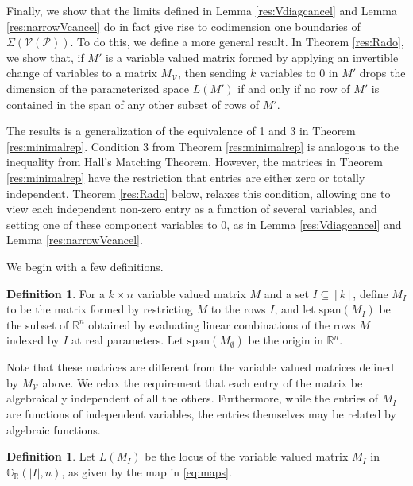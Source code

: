 \documentclass[11pt]{article}
\newcommand{\R}{\mathbb{R}}
\newcommand{\Grall}{\mathbb{G}_{\R}}
\newcommand{\cP}{\mathcal{P}}
\newcommand{\cV}{\mathcal{V}}
\newcommand{\VP}{\cV(\cP)}
\theoremstyle{remark}
\theoremstyle{definition}
\newtheorem{dfn}[thm]{Definition}
\begin{document}
\begin{appendices}

Finally, we show that the limits defined in Lemma \ref{res:Vdiagcancel} and Lemma \ref{res:narrowVcancel} do in fact give rise to codimension one boundaries of $\Sigma(\VP)$. To do this, we define a more general result. In Theorem \ref{res:Rado}, we show that, if $M'$ is a variable valued matrix formed by applying an invertible change of variables to a matrix $M_\cV$, then sending $k$ variables to $0$ in $M'$ drops the dimension of the parameterized space $L(M')$ if and only if no row of $M'$ is contained in the span of any other subset of rows of $M'$.

The results is a generalization of the equivalence of 1 and 3 in Theorem \ref{res:minimalrep}. Condition 3 from Theorem \ref{res:minimalrep} is analogous to the inequality from Hall's Matching Theorem. However, 
the matrices in Theorem \ref{res:minimalrep} have the restriction that entries are either zero or totally independent. Theorem \ref{res:Rado} below, relaxes this condition, allowing one to view each independent non-zero entry as a function of several variables, and setting one of these component variables to $0$, as in Lemma \ref{res:Vdiagcancel} and Lemma \ref{res:narrowVcancel}. 

We begin with a few definitions. 

\begin{dfn}
For a $k \times n$ variable valued matrix $M$ and a set $I \subseteq [k]$, define $M_I$ to be the matrix formed by restricting $M$ to the rows $I$, and let $\mathrm{span}(M_I)$ be the subset of $\mathbb{R}^n$ obtained by evaluating linear combinations of the rows $M$ indexed by $I$ at real parameters. Let $\mathrm{span}(M_{\emptyset})$ be the origin in $\mathbb{R}^n$.
\end{dfn}

Note that these matrices are different from the variable valued matrices defined by $M_{\cV}$ above. We relax the requirement that each entry of the matrix be algebraically independent of all the others. Furthermore, while the entries of $M_I$ are functions of independent variables, the entries themselves may be related by algebraic functions.

\begin{dfn}
Let $L(M_I)$ be the locus of the variable valued matrix $M_I$ in $\Grall(|I|, n)$, as given by the map in \eqref{eq:maps}.
\end{dfn}


\end{appendices}
\end{document}
